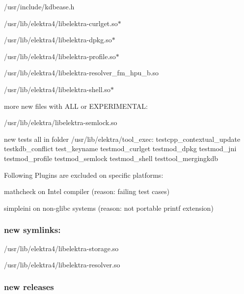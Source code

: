 \begin{DoxyItemize}
\item {\ttfamily /usr/include/kdbease.h}
\item {\ttfamily /usr/lib/elektra4/libelektra-\/curlget.so$\ast$}
\item {\ttfamily /usr/lib/elektra4/libelektra-\/dpkg.so$\ast$}
\item {\ttfamily /usr/lib/elektra4/libelektra-\/profile.so$\ast$}
\item {\ttfamily /usr/lib/elektra4/libelektra-\/resolver\+\_\+fm\+\_\+hpu\+\_\+b.so}
\item {\ttfamily /usr/lib/elektra4/libelektra-\/shell.so$\ast$}
\end{DoxyItemize}

more new files with A\+LL or E\+X\+P\+E\+R\+I\+M\+E\+N\+T\+AL\+:


\begin{DoxyItemize}
\item /usr/lib/elektra/libelektra-\/semlock.so
\end{DoxyItemize}

new tests all in folder /usr/lib/elektra/tool\+\_\+exec\+: testcpp\+\_\+contextual\+\_\+update testkdb\+\_\+conflict test\+\_\+keyname testmod\+\_\+curlget testmod\+\_\+dpkg testmod\+\_\+jni testmod\+\_\+profile testmod\+\_\+semlock testmod\+\_\+shell testtool\+\_\+mergingkdb

Following Plugins are excluded on specific platforms\+:


\begin{DoxyItemize}
\item mathcheck on Intel compiler (reason\+: failing test cases)
\item simpleini on non-\/glibc systems (reason\+: not portable printf extension)
\end{DoxyItemize}

\subsubsection*{new symlinks\+:}


\begin{DoxyItemize}
\item /usr/lib/elektra4/libelektra-\/storage.so
\item /usr/lib/elektra4/libelektra-\/resolver.so
\end{DoxyItemize}

\subsubsection*{new releases}

